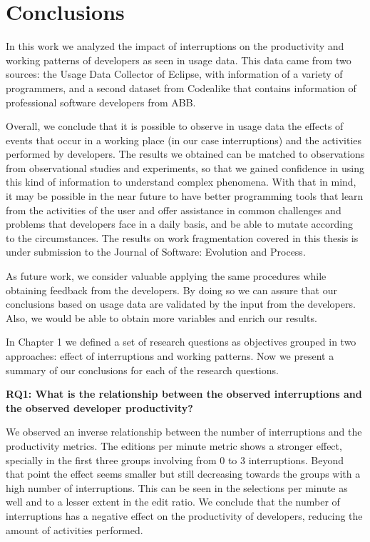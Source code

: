 \chapter{Conclusions}

In this work we analyzed the impact of interruptions on the productivity and working patterns of developers as seen in usage data. This data came from two sources: the Usage Data Collector of Eclipse, with information of a variety of programmers, and a second dataset from Codealike that contains information of professional software developers from ABB.

Overall, we conclude that it is possible to observe in usage data the effects of events that occur in a working place (in our case interruptions) and the activities performed by developers. The results we obtained can be matched to observations from observational studies and experiments, so that we gained confidence in using this kind of information to understand complex phenomena. With that in mind, it may be possible in the near future to have better programming tools that learn from the activities of the user and offer assistance in common challenges and problems that developers face in a daily basis, and be able to mutate according to the circumstances. The results on work fragmentation covered in this thesis is under submission to the Journal of Software: Evolution and Process.

As future work, we consider valuable applying the same procedures while obtaining feedback from the developers. By doing so we can assure that our conclusions based on usage data are validated by the input from the developers. Also, we would be able to obtain more variables and enrich our results.

In Chapter 1 we defined a set of research questions as objectives grouped in two approaches: effect of interruptions and working patterns. Now we present a summary of our conclusions for each of the research questions. 

\textbf{RQ1: What is the relationship between the observed interruptions and the observed developer productivity?} 

We observed an inverse relationship between the number of interruptions and the productivity metrics. The editions per minute metric shows a stronger effect, specially in the first three groups involving from 0 to 3 interruptions. Beyond that point the effect seems smaller but still decreasing towards the groups with a high number of interruptions. This can be seen in the selections per minute as well and to a lesser extent in the edit ratio. We conclude that the number of interruptions has a negative effect on the productivity of developers, reducing the amount of activities performed.

